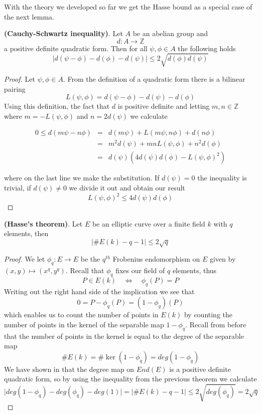 With the theory we developed so far we get the Hasse bound as a special case of the next lemma.

\begin{lemma}
 \textbf{(Cauchy-Schwartz inequality)}. Let $A$ be an abelian group and
$$ d: A \rightarrow \mathbb{Z} $$
a positive definite quadratic form. Then for all $\psi, \phi \in A$ the following holds
$$ \lvert d(\psi-\phi)-d(\phi)-d(\psi) \rvert \leq 2 \sqrt{d(\phi)d(\psi)} $$
\end{lemma}
\begin{proof}
 Let $\psi, \phi \in A$. From the definition of a quadratic form there is a bilinear pairing
$$ L(\psi, \phi) = d(\psi-\phi) - d(\psi) - d(\phi) $$
Using this definition, the fact that $d$ is positive definite and letting $m,n \in \mathbb{Z}$ where
$m = -L(\psi, \phi)$ and $n = 2d(\psi)$ we calculate

\begin{eqnarray}
 0 \leq d(m\psi - n\phi) &=& d(m\psi) + L(m\psi, n\phi) + d(n\phi) \nonumber \\
			 &=& m^2 d(\psi) + mnL(\psi,\phi) + n^2 d(\phi) \nonumber \\
			 &=& d(\psi) \left( 4d(\psi)d(\phi)-L(\psi, \phi)^2 \right) \nonumber 
\end{eqnarray}

where on the last line we make the substitution. If $d(\psi)=0$ the inequality is trivial, if
$d(\psi) \neq 0$ we divide it out and obtain our result
$$L(\psi, \phi)^2 \leq 4d(\psi)d(\phi) $$
\end{proof}


\begin{thm}
 \textbf{(Hasse's theorem)}. Let $E$ be an elliptic curve over a finite field $k$ with $q$ elements, then
$$ \lvert \#E(k) - q - 1 \rvert \leq 2\sqrt{q} $$
\end{thm}
\begin{proof}
 We let $\phi_q: E \rightarrow E$ be the $q^{th}$ Frobenius endomorphism on $E$ given by 
$(x,y) \mapsto (x^q, y^q)$. Recall that $\phi_q$ fixes our field of $q$ elements, thus
$$ P \in E(k) \quad \iff \quad \phi_q(P) = P$$
Writing out the right hand side of the implication we see that
$$ 0 = P - \phi_q(P) = (1 - \phi_q)(P) $$
which enables us to count the number of points in $E(k)$ by counting the number of points in the kernel
of the separable map $1-\phi_q$. Recall from before that the number of points in the kernel is equal
to the degree of the separable map
$$ \#E(k) = \# \ker(1-\phi_q) = deg(1-\phi_q) $$
We have shown in that the degree map on $End(E)$ is a positive definite quadratic form, so
by using the inequality from the previous theorem we calculate
$$\lvert deg(1-\phi_q) - deg(\phi_q) - deg(1)\rvert = \lvert \#E(k) - q - 1\rvert \leq 2\sqrt{deg(\phi_q)} = 2\sqrt{q}$$
\end{proof}

